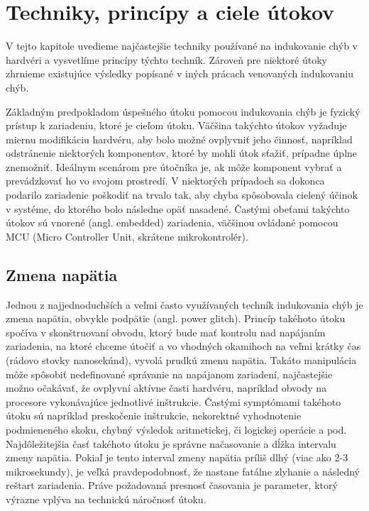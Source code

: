 \chapter{Techniky, princípy a ciele útokov}

\label{kap:teoria} %

V tejto kapitole uvedieme najčastejšie techniky používané na indukovanie chýb v hardvéri a vysvetlíme princípy týchto techník. Zároveň pre niektoré útoky zhrnieme existujúce výsledky popísané v iných prácach venovaných indukovaniu chýb.

Základným predpokladom úspešného útoku pomocou indukovania chýb je fyzický prístup k zariadeniu, ktoré je cieľom útoku. Väčšina takýchto útokov vyžaduje miernu modifikáciu hardvéru, aby bolo možné ovplyvniť jeho činnosť, napríklad odstránenie niektorých komponentov, ktoré by mohli útok sťažiť, prípadne úplne znemožniť. Ideálnym scenárom pre útočníka je, ak môže komponent vybrať a prevádzkovať ho vo svojom prostredí. V niektorých prípadoch sa dokonca podarilo zariadenie poškodiť na trvalo tak, aby chyba spôsobovala cielený účinok v systéme, do ktorého bolo následne opäť nasadené. Častými obeťami takýchto útokov sú vnorené (angl. embedded) zariadenia, väčšinou ovládané pomocou MCU (Micro Controller Unit, skrátene mikrokontrolér).

\section{Zmena napätia}
Jednou z najjednoduchších a veľmi často využívaných techník indukovania chýb je zmena napätia, obvykle podpätie (angl. power glitch). Princíp takéhoto útoku spočíva v skonštruovaní obvodu, ktorý bude mať kontrolu nad napájaním zariadenia, na ktoré chceme útočiť a vo vhodných okamihoch na veľmi krátky čas (rádovo stovky nanosekúnd), vyvolá prudkú zmenu napätia. Takáto manipulácia môže spôsobiť nedefinované správanie na napájanom zariadení, najčastejšie možno očakávať, že ovplyvní aktívne časti hardvéru, napríklad obvody na procesore vykonávajúce jednotlivé inštrukcie. Častými symptómami takéhoto útoku sú napríklad preskočenie inštrukcie, nekorektné vyhodnotenie podmieneného skoku, chybný výsledok aritmetickej, či logickej operácie a pod. Najdôležitejšia časť takéhoto útoku je správne načasovanie a dĺžka intervalu zmeny napätia. Pokiaľ je tento interval zmeny napätia príliš dlhý (viac ako 2-3 mikrosekundy), je veľká pravdepodobnosť, že nastane fatálne zlyhanie a následný reštart zariadenia. Práve požadovaná presnosť časovania je parameter, ktorý výrazne vplýva na technickú náročnosť útoku.

